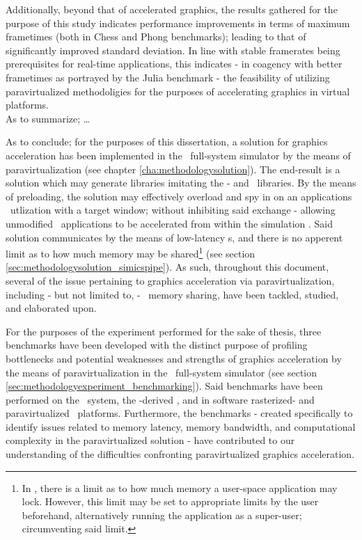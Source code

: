 Additionally, beyond that of accelerated graphics, the results gathered for the purpose of this study indicates performance improvements in terms of maximum frametimes (both in Chess and Phong benchmarks); leading to that of significantly improved standard deviation.
In line with stable framerates being prerequisites for real-time applications, this indicates - in coagency with better frametimes as portrayed by the Julia benchmark - the feasibility of utilizing paravirtualized methodoligies for the purposes of accelerating graphics in virtual platforms.\\

As to summarize; \ldots


\noindent
As to conclude; for the purposes of this dissertation, a solution for graphics acceleration has been implemented in the \dvttermsimics\ full-system simulator by the means of paravirtualization (see chapter \ref{cha:methodologysolution}).
The end-result is a solution which may generate libraries imitating the \dvttermegl - and \dvttermopenglestwopointo\ libraries.
By the means of preloading, the solution may effectively overload and spy in on an applications \dvttermegl\ utlization with a target window; without inhibiting said exchange - allowing unmodified \dvttermopengl\ applications to be accelerated from within the simulation \dvttermtarget .
Said solution communicates by the means of low-latency \dvttermmagicinstruction s, and there is no apperent limit as to how much memory may be shared\footnote{In \dvttermlinux , there is a limit as to how much memory a user-space application may lock. However, this limit may be set to appropriate limits by the user beforehand, alternatively running the application as a super-user; circumventing said limit.} (see section \ref{sec:methodologysolution_simicspipe}).
As such, throughout this document, several of the issue pertaining to graphics acceleration via paravirtualization, including - but not limited to, \dvttermtarget - \dvttermhost\ memory sharing, have been tackled, studied, and elaborated upon.

For the purposes of the experiment performed for the sake of thesis, three benchmarks have been developed with the distinct purpose of profiling bottlenecks and potential weaknesses and strengths of graphics acceleration by the means of paravirtualization in the \dvttermsimics\ full-system simulator (see section \ref{sec:methodologyexperiment_benchmarking}).
Said benchmarks have been performed on the \dvttermhost\ system, the \dvttermqemu -derived \dvttermandroidemulator , and in software rasterized- and paravirtualized \dvttermsimics\ platforms.
Furthermore, the benchmarks - created specifically to identify issues related to memory latency, memory bandwidth, and computational complexity in the paravirtualized solution - have contributed to our understanding of the difficulties confronting paravirtualized graphics acceleration.

